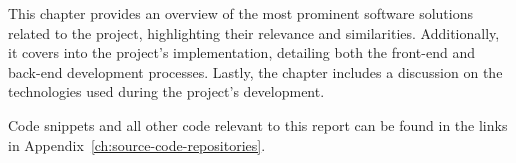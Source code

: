 This chapter provides an overview of the most prominent software solutions related to the project, highlighting their
relevance and similarities.
Additionally, it covers into the project's implementation,
detailing both the front-end and back-end development processes.
Lastly, the chapter includes a discussion on the technologies used during the project's development.

Code snippets and all other code relevant to this report can be found in the links in
Appendix~\ref{ch:source-code-repositories}.

